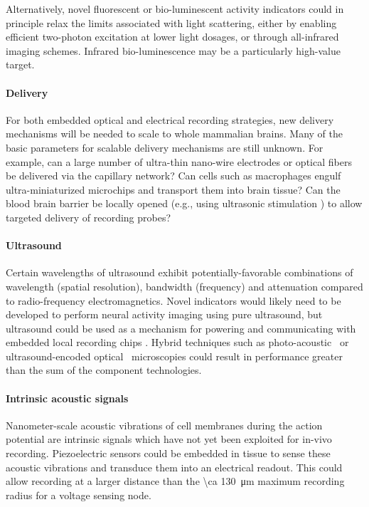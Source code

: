 Alternatively, novel fluorescent or bio-luminescent activity indicators could in principle relax the limits associated with light scattering, either by enabling efficient two-photon excitation at lower light dosages, or through all-infrared imaging schemes. Infrared bio-luminescence may be a particularly high-value target.

\paragraph{Delivery} For both embedded optical and electrical recording strategies, new delivery mechanisms will be needed to scale to whole mammalian brains. Many of the basic parameters for scalable delivery mechanisms are still unknown. For example, can a large number of ultra-thin nano-wire electrodes or optical fibers be delivered via the capillary network? Can cells such as macrophages engulf ultra-miniaturized microchips and transport them into brain tissue? Can the blood brain barrier be locally opened (e.g., using ultrasonic stimulation \cite{hynynen2005local}) to allow targeted delivery of recording probes?

\paragraph{Ultrasound} Certain wavelengths of ultrasound exhibit potentially-favorable combinations of wavelength (spatial resolution), bandwidth (frequency) and attenuation compared to radio-frequency electromagnetics. Novel indicators \cite{ShapiroGasNanostructures} would likely need to be developed to perform neural activity imaging using pure ultrasound, but ultrasound could be used as a mechanism for powering and communicating with embedded local recording chips \cite{Seo2013}. Hybrid techniques such as photo-acoustic~\cite{filonov12} or ultrasound-encoded optical~\cite{wang12} microscopies could result in performance greater than the sum of the component technologies.

\paragraph{Intrinsic acoustic signals} Nanometer-scale acoustic vibrations of cell membranes during the action potential are intrinsic signals which have not yet been exploited for in-vivo recording. Piezoelectric sensors could be embedded in tissue to sense these acoustic vibrations and transduce them into an electrical readout. This could allow recording at a larger distance than the \SI{\ca 130}{\micro\meter} maximum recording radius for a voltage sensing node.

